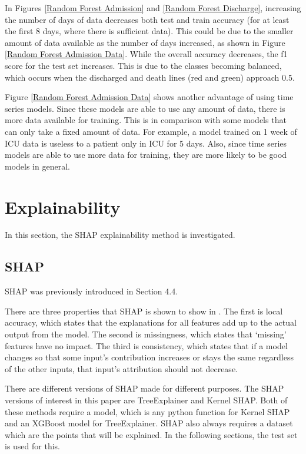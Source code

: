 \documentclass[12pt]{article}
\begin{document}
In Figures \ref{Random Forest Admission} and \ref{Random Forest Discharge}, increasing the number of days of data decreases both test and train accuracy (for at least the first 8 days, where there is sufficient data). This could be due to the smaller amount of data available as the number of days increased, as shown in Figure \ref{Random Forest Admission Data}. While the overall accuracy decreases, the f1 score for the test set increases. This is due to the classes becoming balanced, which occurs when the discharged and death lines (red and green) approach 0.5. 

Figure \ref{Random Forest Admission Data} shows another advantage of using time series models. Since these models are able to use any amount of data, there is more data available for training. This is in comparison with some models that can only take a fixed amount of data. For example, a model trained on 1 week of ICU data is useless to a patient only in ICU for 5 days. Also, since time series models are able to use more data for training, they are more likely to be good models in general. 

\section{Explainability}
In this section, the SHAP explainability method is investigated. 

\subsection{SHAP}

SHAP was previously introduced in Section 4.4. 

There are three properties that SHAP is shown to show in \cite{SHAP}. The first is local accuracy, which states that the explanations for all features add up to the actual output from the model. The second is missingness, which states that `missing' features have no impact. The third is consistency, which states that if a model changes so that some input's contribution increases or stays the same regardless of the other inputs, that input’s attribution should not decrease. 

There are different versions of SHAP made for different purposes. The SHAP versions of interest in this paper are TreeExplainer and Kernel SHAP. Both of these methods require a model, which is any python function for Kernel SHAP and an XGBoost model for TreeExplainer. SHAP also always requires a dataset which are the points that will be explained. In the following sections, the test set is used for this.
\end{document}
